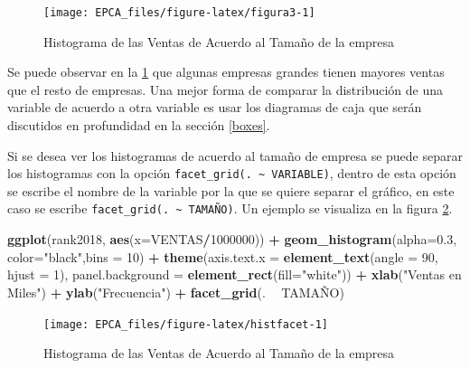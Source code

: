 \documentclass[letterpaper,]{book}
\newenvironment{Shaded}{\begin{snugshade}}{\end{snugshade}}
\newcommand{\DataTypeTok}[1]{\textcolor[rgb]{0.13,0.29,0.53}{#1}}
\newcommand{\DecValTok}[1]{\textcolor[rgb]{0.00,0.00,0.81}{#1}}
\newcommand{\FloatTok}[1]{\textcolor[rgb]{0.00,0.00,0.81}{#1}}
\newcommand{\KeywordTok}[1]{\textcolor[rgb]{0.13,0.29,0.53}{\textbf{#1}}}
\newcommand{\NormalTok}[1]{#1}
\newcommand{\OperatorTok}[1]{\textcolor[rgb]{0.81,0.36,0.00}{\textbf{#1}}}
\newcommand{\StringTok}[1]{\textcolor[rgb]{0.31,0.60,0.02}{#1}}
\begin{document}
\begin{figure}[h!]

{\centering \texttt{[image: EPCA\_files/figure-latex/figura3-1]} 

}

\caption{Histograma de las Ventas de Acuerdo al Tamaño de la empresa}\label{fig:figura3}
\end{figure}

Se puede observar en la \ref{fig:figura3} que algunas empresas grandes tienen mayores ventas que el resto de empresas. Una mejor forma de comparar la distribución de una variable de acuerdo a otra variable es usar los diagramas de caja que serán discutidos en profundidad en la sección \ref{boxes}.

Si se desea ver los histogramas de acuerdo al tamaño de empresa se puede separar los histogramas con la opción \texttt{facet\_grid(.\ \textasciitilde{}\ VARIABLE)}, dentro de esta opción se escribe el nombre de la variable por la que se quiere separar el gráfico, en este caso se escribe \texttt{facet\_grid(.\ \textasciitilde{}\ TAMAÑO)}. Un ejemplo se visualiza en la figura \ref{fig:histfacet}.

\begin{Shaded}
\begin{Highlighting}[]
\KeywordTok{ggplot}\NormalTok{(rank2018, }\KeywordTok{aes}\NormalTok{(}\DataTypeTok{x=}\NormalTok{VENTAS}\OperatorTok{/}\DecValTok{1000000}\NormalTok{)) }\OperatorTok{+}\StringTok{ }
\StringTok{  }\KeywordTok{geom_histogram}\NormalTok{(}\DataTypeTok{alpha=}\FloatTok{0.3}\NormalTok{, }\DataTypeTok{color=}\StringTok{"black"}\NormalTok{,}\DataTypeTok{bins =} \DecValTok{10}\NormalTok{) }\OperatorTok{+}
\StringTok{  }\KeywordTok{theme}\NormalTok{(}\DataTypeTok{axis.text.x =} \KeywordTok{element_text}\NormalTok{(}\DataTypeTok{angle =} \DecValTok{90}\NormalTok{, }\DataTypeTok{hjust =} \DecValTok{1}\NormalTok{), }
        \DataTypeTok{panel.background =} \KeywordTok{element_rect}\NormalTok{(}\DataTypeTok{fill=}\StringTok{"white"}\NormalTok{)) }\OperatorTok{+}
\StringTok{  }\KeywordTok{xlab}\NormalTok{(}\StringTok{"Ventas en Miles"}\NormalTok{) }\OperatorTok{+}\StringTok{ }\KeywordTok{ylab}\NormalTok{(}\StringTok{"Frecuencia"}\NormalTok{) }\OperatorTok{+}
\StringTok{  }\KeywordTok{facet_grid}\NormalTok{(. }\OperatorTok{~}\StringTok{ }\NormalTok{TAMAÑO)}
\end{Highlighting}
\end{Shaded}

\begin{figure}[h!]

{\centering \texttt{[image: EPCA\_files/figure-latex/histfacet-1]} 

}

\caption{Histograma de las Ventas de Acuerdo al Tamaño de la empresa}\label{fig:histfacet}
\end{figure}
\end{document}
